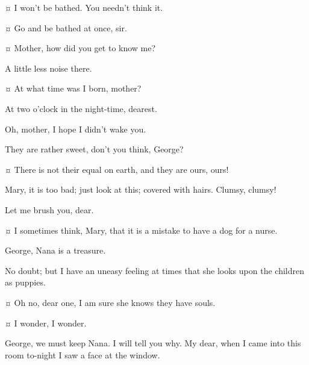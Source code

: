 \begin{drama}
\johnspeaks {}¤
I won't be bathed.
You needn't think it.

\mrdarlingspeaks {}¤
Go and be bathed at once, sir.


\michaelspeaks {}¤
Mother, how did you get to know me?

\mrdarlingspeaks
A little less noise there.

\michaelspeaks {}¤
At what time was I born, mother?

\mrsdarlingspeaks
At two o'clock in the night-time, dearest.

\michaelspeaks
Oh, mother, I hope I didn't wake you.

\mrsdarlingspeaks
They are rather sweet, don't you think, George?

\mrdarlingspeaks {}¤
There is not their equal on earth, and they are ours, ours!


\mrdarlingspeaks
Mary, it is too bad; just look at this; covered with hairs.
Clumsy, clumsy!


\mrsdarlingspeaks
Let me brush you, dear.


\mrdarlingspeaks {}¤
I sometimes think, Mary, that it is a mistake to have a dog for a nurse.

\mrsdarlingspeaks
George, Nana is a treasure.

\mrdarlingspeaks
No doubt; but I have an uneasy feeling at times that she looks upon the children as puppies.

\mrsdarlingspeaks {}¤
Oh no, dear one, I am sure she knows they have souls.

\mrdarlingspeaks {}¤
I wonder, I wonder.


\mrsdarlingspeaks
George, we must keep Nana.
I will tell you why.
My dear, when I came into this room to-night I saw a face at the window.


\end{drama}
